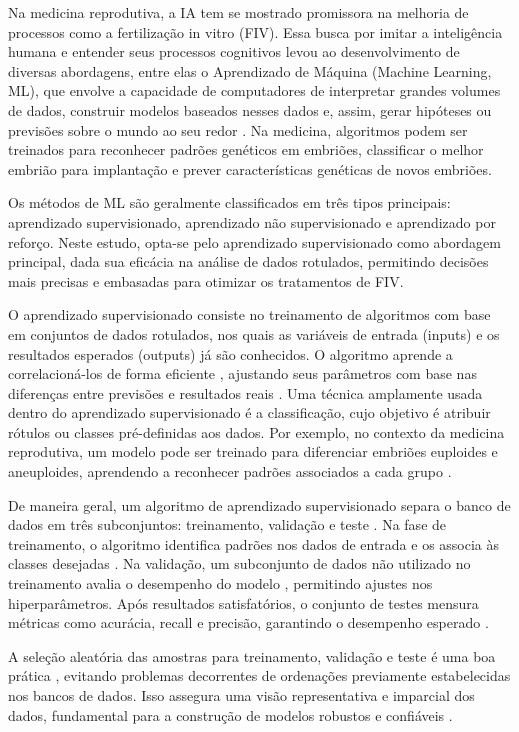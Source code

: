 Na medicina reprodutiva, a IA tem se mostrado promissora na melhoria de processos como a fertilização in vitro (FIV). Essa busca por imitar a inteligência humana e entender seus processos cognitivos levou ao desenvolvimento de diversas abordagens, entre elas o Aprendizado de Máquina (Machine Learning, ML), que envolve a capacidade de computadores de interpretar grandes volumes de dados, construir modelos baseados nesses dados e, assim, gerar hipóteses ou previsões sobre o mundo ao seu redor \cite{russell2016}. Na medicina, algoritmos podem ser treinados para reconhecer padrões genéticos em embriões, classificar o melhor embrião para implantação e prever características genéticas de novos embriões. 

Os métodos de ML são geralmente classificados em três tipos principais: aprendizado supervisionado, aprendizado não supervisionado e aprendizado por reforço. Neste estudo, opta-se pelo aprendizado supervisionado como abordagem principal, dada sua eficácia na análise de dados rotulados, permitindo decisões mais precisas e embasadas para otimizar os tratamentos de FIV.

O aprendizado supervisionado consiste no treinamento de algoritmos com base em conjuntos de dados rotulados, nos quais as variáveis de entrada (inputs) e os resultados esperados (outputs) já são conhecidos. O algoritmo aprende a correlacioná-los de forma eficiente \cite{russell2016}, ajustando seus parâmetros com base nas diferenças entre previsões e resultados reais \cite{trask2019}. Uma técnica amplamente usada dentro do aprendizado supervisionado é a classificação, cujo objetivo é atribuir rótulos ou classes pré-definidas aos dados. Por exemplo, no contexto da medicina reprodutiva, um modelo pode ser treinado para diferenciar embriões euploides e aneuploides, aprendendo a reconhecer padrões associados a cada grupo \cite{izbicki2020}.

De maneira geral, um algoritmo de aprendizado supervisionado separa o banco de dados em três subconjuntos: treinamento, validação e teste \cite{izbicki2020}. Na fase de treinamento, o algoritmo identifica padrões nos dados de entrada e os associa às classes desejadas \cite{izbicki2020}. Na validação, um subconjunto de dados não utilizado no treinamento avalia o desempenho do modelo \cite{izbicki2020}, permitindo ajustes nos hiperparâmetros. Após resultados satisfatórios, o conjunto de testes mensura métricas como acurácia, recall e precisão, garantindo o desempenho esperado \cite{izbicki2020}.

A seleção aleatória das amostras para treinamento, validação e teste é uma boa prática \cite{izbicki2020}, evitando problemas decorrentes de ordenações previamente estabelecidas nos bancos de dados. Isso assegura uma visão representativa e imparcial dos dados, fundamental para a construção de modelos robustos e confiáveis \cite{izbicki2020}.

